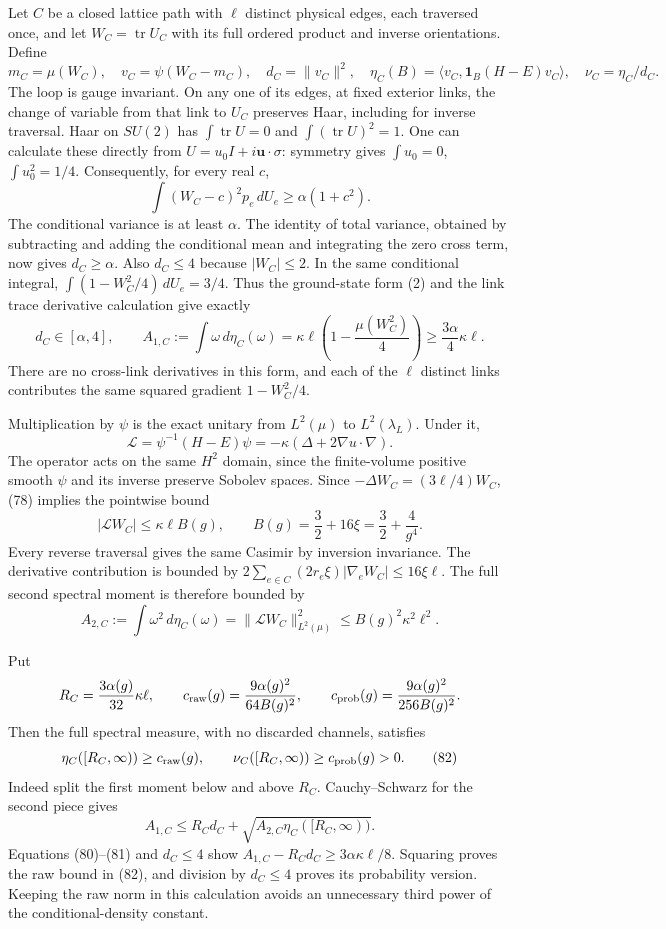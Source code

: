 \documentclass[
  11pt,
]{article}
\begin{document}
Let \(C\) be a closed lattice path with \(\ell\) distinct physical
edges, each traversed once, and let \(W_C=\operatorname{tr}U_C\) with
its full ordered product and inverse orientations. Define \[
 m_C=\mu(W_C),\quad
 v_C=\psi(W_C-m_C),\quad d_C=\|v_C\|^2,\quad
 \eta_C(B)=\langle v_C,\mathbf1_B(H-E)v_C\rangle,\quad
 \nu_C=\eta_C/d_C .
\] The loop is gauge invariant. On any one of its edges, at fixed
exterior links, the change of variable from that link to \(U_C\)
preserves Haar, including for inverse traversal. Haar on \(SU(2)\) has
\(\int\operatorname{tr}U=0\) and \(\int(\operatorname{tr}U)^2=1\). One
can calculate these directly from \(U=u_0I+i\mathbf u\cdot\sigma\):
symmetry gives \(\int u_0=0\), \(\int u_0^2=1/4\). Consequently, for
every real \(c\), \[
 \int(W_C-c)^2p_e\,dU_e\ge\alpha(1+c^2).
\] The conditional variance is at least \(\alpha\). The identity of
total variance, obtained by subtracting and adding the conditional mean
and integrating the zero cross term, now gives \(d_C\ge\alpha\). Also
\(d_C\le4\) because \(|W_C|\le2\). In the same conditional integral,
\(\int(1-W_C^2/4)\,dU_e=3/4\). Thus the ground-state form (2) and the
link trace derivative calculation give exactly \[
 d_C\in[\alpha,4],\qquad
 A_{1,C}:=\int\omega\,d\eta_C(\omega)
 =\kappa\ell\left(1-\frac{\mu(W_C^2)}4\right)
 \ge\frac{3\alpha}{4}\kappa\ell .
 \tag{80}
\] There are no cross-link derivatives in this form, and each of the
\(\ell\) distinct links contributes the same squared gradient
\(1-W_C^2/4\).

Multiplication by \(\psi\) is the exact unitary from \(L^2(\mu)\) to
\(L^2(\lambda_L)\). Under it, \[
 \mathscr L=\psi^{-1}(H-E)\psi
       =-\kappa(\Delta+2\nabla u\cdot\nabla).
\] The operator acts on the same \(H^2\) domain, since the finite-volume
positive smooth \(\psi\) and its inverse preserve Sobolev spaces. Since
\(-\Delta W_C=(3\ell/4)W_C\), (78) implies the pointwise bound \[
 |\mathscr L W_C|\le\kappa\ell B(g),\qquad
 B(g)=\frac32+16\xi=\frac32+\frac4{g^4}.
\] Every reverse traversal gives the same Casimir by inversion
invariance. The derivative contribution is bounded by
\(2\sum_{e\in C}(2r_e\xi)|\nabla_eW_C|\le16\xi\ell\). The full second
spectral moment is therefore bounded by \[
 A_{2,C}:=\int\omega^2\,d\eta_C(\omega)
       =\|\mathscr L W_C\|_{L^2(\mu)}^2
       \le B(g)^2\kappa^2\ell^2 .
 \tag{81}
\]

Put \[
 R_C=\frac{3\alpha(g)}{32}\kappa\ell,\qquad
 c_{\rm raw}(g)=\frac{9\alpha(g)^2}{64B(g)^2},\qquad
 c_{\rm prob}(g)=\frac{9\alpha(g)^2}{256B(g)^2}.
\] Then the full spectral measure, with no discarded channels, satisfies
\[
 \eta_C([R_C,\infty))\ge c_{\rm raw}(g),\qquad
 \nu_C([R_C,\infty))\ge c_{\rm prob}(g)>0 .
 \tag{82}
\] Indeed split the first moment below and above \(R_C\).
Cauchy--Schwarz for the second piece gives \[
 A_{1,C}\le R_Cd_C+
    \sqrt{A_{2,C}\eta_C([R_C,\infty))}.
\] Equations (80)--(81) and \(d_C\le4\) show
\(A_{1,C}-R_Cd_C\ge3\alpha\kappa\ell/8\). Squaring proves the raw bound
in (82), and division by \(d_C\le4\) proves its probability version.
Keeping the raw norm in this calculation avoids an unnecessary third
power of the conditional-density constant.
\end{document}
